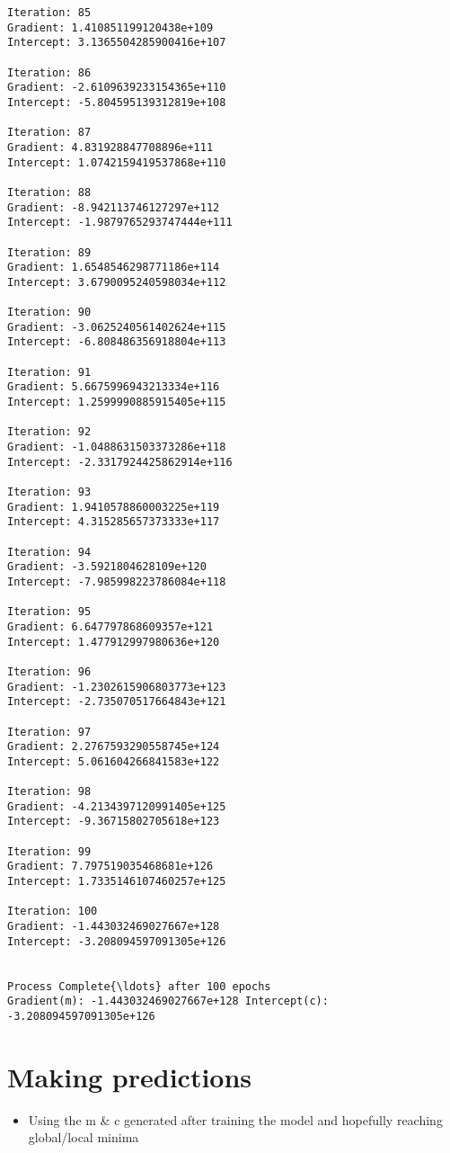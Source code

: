 \documentclass[11pt]{article}
\providecommand{\tightlist}{%
      \setlength{\itemsep}{0pt}\setlength{\parskip}{0pt}}
\begin{document}
\begin{Verbatim}[commandchars=\\\{\}]
Iteration: 85 
Gradient: 1.410851199120438e+109 
Intercept: 3.1365504285900416e+107 

Iteration: 86 
Gradient: -2.6109639233154365e+110 
Intercept: -5.804595139312819e+108 

Iteration: 87 
Gradient: 4.831928847708896e+111 
Intercept: 1.0742159419537868e+110 

Iteration: 88 
Gradient: -8.942113746127297e+112 
Intercept: -1.9879765293747444e+111 

Iteration: 89 
Gradient: 1.6548546298771186e+114 
Intercept: 3.6790095240598034e+112 

Iteration: 90 
Gradient: -3.0625240561402624e+115 
Intercept: -6.808486356918804e+113 

Iteration: 91 
Gradient: 5.6675996943213334e+116 
Intercept: 1.2599990885915405e+115 

Iteration: 92 
Gradient: -1.0488631503373286e+118 
Intercept: -2.3317924425862914e+116 

Iteration: 93 
Gradient: 1.9410578860003225e+119 
Intercept: 4.315285657373333e+117 

Iteration: 94 
Gradient: -3.5921804628109e+120 
Intercept: -7.985998223786084e+118 

Iteration: 95 
Gradient: 6.647797868609357e+121 
Intercept: 1.477912997980636e+120 

Iteration: 96 
Gradient: -1.2302615906803773e+123 
Intercept: -2.735070517664843e+121 

Iteration: 97 
Gradient: 2.2767593290558745e+124 
Intercept: 5.061604266841583e+122 

Iteration: 98 
Gradient: -4.2134397120991405e+125 
Intercept: -9.36715802705618e+123 

Iteration: 99 
Gradient: 7.797519035468681e+126 
Intercept: 1.7335146107460257e+125 

Iteration: 100 
Gradient: -1.443032469027667e+128 
Intercept: -3.208094597091305e+126 


Process Complete{\ldots} after 100 epochs
Gradient(m): -1.443032469027667e+128 Intercept(c): -3.208094597091305e+126

    \end{Verbatim}

    \section{Making predictions}\label{making-predictions}

\begin{itemize}
\tightlist
\item
  Using the m \& c generated after training the model and hopefully
  reaching global/local minima
\end{itemize}
\end{document}
